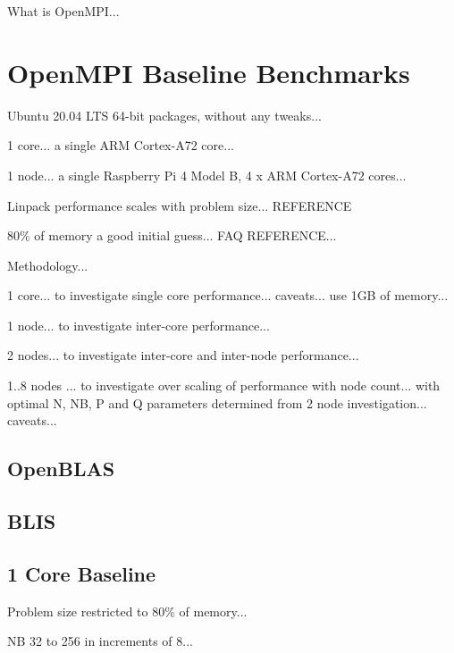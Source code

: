 \documentclass{article}
\begin{document}
What is OpenMPI...



\section{OpenMPI Baseline Benchmarks}

Ubuntu 20.04 LTS 64-bit packages, without any tweaks...

1 core... a single ARM Cortex-A72 core...

1 node... a single Raspberry Pi 4 Model B, 4 x ARM Cortex-A72 cores...

Linpack performance scales with problem size... REFERENCE

80\% of memory a good initial guess... FAQ REFERENCE...


Methodology...

1 core... to investigate single core performance... caveats... use 1GB of memory...

1 node... to investigate inter-core performance...

2 nodes... to investigate inter-core and inter-node performance...

1..8 nodes ... to investigate over scaling of performance with node count... with optimal N, NB, P and Q parameters determined from 2 node investigation... caveats...



\subsection{OpenBLAS}



\subsection{BLIS}



\subsection{1 Core Baseline}

Problem size restricted to 80\% of memory...

NB 32 to 256 in increments of 8...
\end{document}
